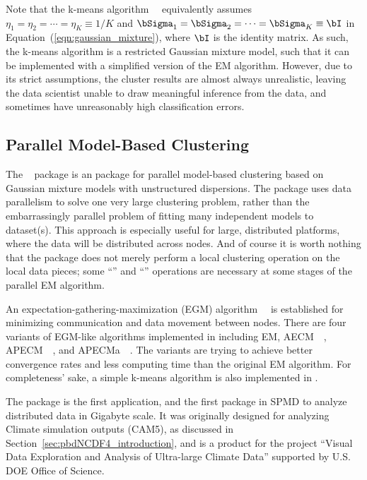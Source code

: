 Note that the k-means algorithm~\citep{Forgy1965}~
equivalently assumes
$\eta_1 = \eta_2 = \cdots = \eta_K \equiv 1/K$ and
$\bSigma_1 = \bSigma_2 = \cdots = \bSigma_K \equiv \bI$
in Equation~(\ref{eqn:gaussian_mixture}), where
$\bI$ is the identity matrix.
As such, the k-means algorithm is a restricted Gaussian mixture model, such
that it can be implemented with a simplified version of the EM algorithm.
However, due to its strict assumptions, the cluster results are almost always
unrealistic, leaving the data scientist unable to draw meaningful inference
from the data, and sometimes have unreasonably high classification errors.


\subsection{Parallel Model-Based Clustering}

The ~\citep{Chen2012pmclustpackage}
package is an 
package for parallel model-based clustering based on Gaussian mixture models
with unstructured dispersions. The package uses data parallelism to solve one
very large clustering problem, rather than the embarrassingly parallel
problem of fitting many independent models to dataset(s). This approach is
especially useful for large, distributed platforms, where the data will be
distributed across nodes. And of course it is worth nothing that the package
does not merely perform a local clustering operation on the local data
pieces; some ``'' and ``'' operations are necessary
at some stages of the parallel EM algorithm.

An expectation-gathering-maximization (EGM)
algorithm~\citep{Chen2013}~
is established for minimizing communication and data movement between nodes.
There are four variants of EGM-like algorithms implemented in 
including EM, AECM~\citep{Meng1997}~,
APECM~\citep{Chen2011}~, and
APECMa~\citep{Chen2013}~. The variants are trying to
achieve better convergence rates and less computing time than the original
EM algorithm. For completeness' sake, a simple k-means algorithm is also
implemented in .

The  package is the first
 application, and the first
 package in SPMD to analyze distributed data in Gigabyte scale.
It was originally designed for analyzing Climate simulation outputs (CAM5),
as discussed in Section~\ref{sec:pbdNCDF4_introduction}, and
is a product for the project
``Visual Data Exploration and Analysis of Ultra-large Climate Data''
supported by U.S. DOE Office of Science.

